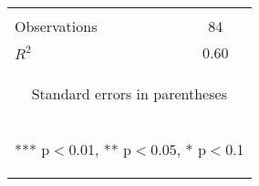 \begin{center}
\begin{tabular}{lc}
\vspace{4pt} & \begin{footnotesize}\end{footnotesize} \\
Observations & 84 \\
 $R^2$ & 0.60 \\ \hline
\multicolumn{2}{c}{\begin{footnotesize} Standard errors in parentheses\end{footnotesize}} \\
\multicolumn{2}{c}{\begin{footnotesize} *** p$<$0.01, ** p$<$0.05, * p$<$0.1\end{footnotesize}} \\
\end{tabular}
\end{center}
